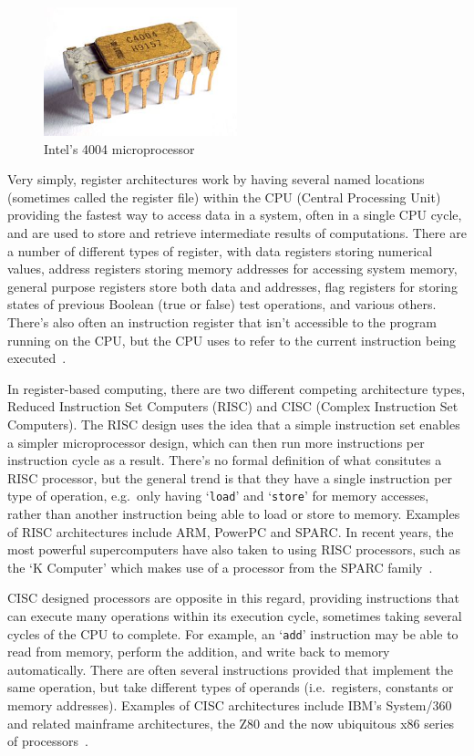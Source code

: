 \begin{figure}
  \includegraphics[width=0.5\textwidth]{imgs/Intel_C4004}
  \caption{Intel's 4004 microprocessor}\label{fig:4004}
\end{figure}

Very simply, register architectures work by having several named locations
(sometimes called the register file) within the CPU (Central Processing Unit)
providing the fastest way to access data in a system, often in a single CPU
cycle, and are used to store and retrieve intermediate results of computations.
There are a number of different types of register, with data registers storing
numerical values, address registers storing memory addresses for accessing
system memory, general purpose registers store both data and addresses, flag
registers for storing states of previous Boolean (true or false) test
operations, and various others. There's also often an instruction register that
isn't accessible to the program running on the CPU, but the CPU uses to refer to
the current instruction being
executed~\cite{Mittal2016RegisterFile}\cite{Patterson2011Computer}.

In register-based computing, there are two different competing architecture
types, Reduced Instruction Set Computers (RISC) and CISC (Complex Instruction
Set Computers). The RISC design uses the idea that a simple instruction set
enables a simpler microprocessor design, which can then run more instructions
per instruction cycle as a result. There's no formal definition of what
consitutes a RISC processor, but the general trend is that they have a single
instruction per type of operation, e.g.\ only having `\texttt{load}' and
`\texttt{store}' for memory accesses, rather than another instruction being able
to load or store to memory. Examples of RISC architectures include ARM, PowerPC
and SPARC\@. In recent years, the most powerful supercomputers have also taken
to using RISC processors, such as the `K Computer' which makes use of a
processor from the SPARC family~\cite{Yokokawa2011KCJ}.

CISC designed processors are opposite in this regard, providing instructions
that can execute many operations within its execution cycle, sometimes taking
several cycles of the CPU to complete. For example, an `\texttt{add}'
instruction may be able to read from memory, perform the addition, and write
back to memory automatically. There are often several instructions provided that
implement the same operation, but take different types of operands (i.e.\
registers, constants or memory addresses). Examples of CISC architectures
include IBM's System/360 and related mainframe architectures, the Z80 and the
now ubiquitous x86 series of processors~\cite{Patterson1980CRI}.

